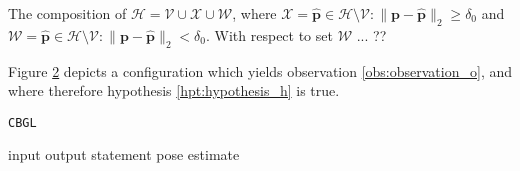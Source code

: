 \begin{remark}
  \label{rem:remark_1}
  The composition of
  $\mathcal{H} = \mathcal{V} \cup \mathcal{X} \cup \mathcal{W}$, where
  $\mathcal{X} = \hat{\bm{p}} \in {\mathcal{H} \setminus \mathcal{V}}: \|\bm{p}-\hat{\bm{p}}\|_2 \geq \delta_0$ and
  $\mathcal{W} = \hat{\bm{p}} \in {\mathcal{H} \setminus \mathcal{V}}: \|\bm{p}-\hat{\bm{p}}\|_2 < \delta_0$.
  With respect to set $\mathcal{W}$ ... ??
\end{remark}


Figure \ref{fig:h_fig1} depicts a configuration which yields observation
\ref{obs:observation_o}, and where therefore hypothesis \ref{hpt:hypothesis_h}
is true.


\begin{figure}
  
  \vspace{1cm}
  \caption{\small }
  \label{fig:h_fig1}
\end{figure}

\begin{figure}
  
  \vspace{1cm}
  \caption{\small }
  \label{fig:h_fig1}
\end{figure}


\begin{figure}[]\centering
  
  \caption{\small }
  \label{fig:cbgl}
\end{figure}


\begin{figure}[]\centering
  
  \caption{\small }
  \label{fig:cbgl}
\end{figure}




\lipsum[0-8]



\begin{algorithm}
  \caption{\texttt{CBGL}}
  \begin{spacing}{1.2}
  \begin{algorithmic}[1]
    \REQUIRE input
    \ENSURE output
    \STATE statement
    \RETURN pose estimate
  \end{algorithmic}
  \end{spacing}
  \label{alg:algorithm_cbgl}
\end{algorithm}
